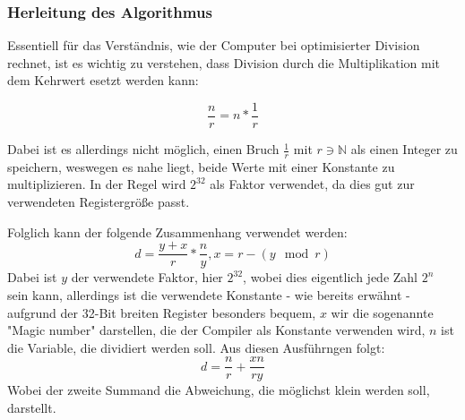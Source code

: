 \documentclass[11pt]{article} %
\begin{document}
\begin{multicols}{2}
\subsubsection{Herleitung des Algorithmus}
Essentiell für das Verständnis, wie der Computer bei optimisierter Division rechnet, ist es wichtig zu verstehen, dass Division durch die Multiplikation mit dem Kehrwert esetzt werden kann:

\begin{equation*}
\frac{n}{r} = n * \frac{1}{r}
\end{equation*}

Dabei ist es allerdings nicht möglich, einen Bruch $\frac{1}{r}$ mit $r \ni \mathbb{N}$ als einen Integer zu speichern, weswegen es nahe liegt, beide Werte mit einer Konstante zu multiplizieren.
In der Regel wird $2^{32}$ als Faktor verwendet, da dies gut zur verwendeten Registergröße passt.

Folglich kann der folgende Zusammenhang verwendet werden:
\begin{equation*}
d = \frac{y+x}{r} * \frac{n}{y} , x = r - (y\mod{r})
\end{equation*}
Dabei ist $y$ der verwendete Faktor, hier $2^{32}$, wobei dies eigentlich jede Zahl $2^n$ sein kann,
allerdings ist die verwendete Konstante - wie bereits erwähnt - aufgrund der 32-Bit breiten Register besonders bequem, $x$ wir die sogenannte "Magic number" darstellen, die der Compiler als Konstante verwenden wird, $n$ ist die Variable, die dividiert werden soll. Aus diesen Ausführngen folgt:
\begin{equation*}
d = \frac{n}{r} + \frac{xn}{ry}
\end{equation*}
Wobei der zweite Summand die Abweichung, die möglichst klein werden soll, darstellt.




\end{multicols}
\end{document}
